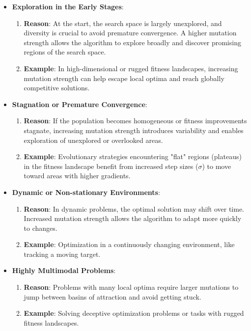 \documentclass[12pt,letterpaper]{article}
\begin{document}
\begin{itemize}
    \item \textbf{Exploration in the Early Stages}:
    \begin{enumerate}
        \item \textbf{Reason}: At the start, the search space is largely unexplored, and diversity is crucial to avoid premature convergence. A higher mutation strength allows the algorithm to explore broadly and discover promising regions of the search space.
        \item \textbf{Example}: In high-dimensional or rugged fitness landscapes, increasing mutation strength can help escape local optima and reach globally competitive solutions.
    \end{enumerate}
    \item \textbf{Stagnation or Premature Convergence}:
    \begin{enumerate}
        \item \textbf{Reason}: If the population becomes homogeneous or fitness improvements stagnate, increasing mutation strength introduces variability and enables exploration of unexplored or overlooked areas.
        \item \textbf{Example}: Evolutionary strategies encountering "flat" regions (plateaus) in the fitness landscape benefit from increased step sizes (\( \sigma \)) to move toward areas with higher gradients.
    \end{enumerate}
    \item \textbf{Dynamic or Non-stationary Environments}:
    \begin{enumerate}
        \item \textbf{Reason}: In dynamic problems, the optimal solution may shift over time. Increased mutation strength allows the algorithm to adapt more quickly to changes.
        \item \textbf{Example}: Optimization in a continuously changing environment, like tracking a moving target.
    \end{enumerate}
    \item \textbf{Highly Multimodal Problems}:
    \begin{enumerate}
        \item \textbf{Reason}: Problems with many local optima require larger mutations to jump between basins of attraction and avoid getting stuck.
        \item \textbf{Example}: Solving deceptive optimization problems or tasks with rugged fitness landscapes.
    \end{enumerate}
\end{itemize}
\end{document}
